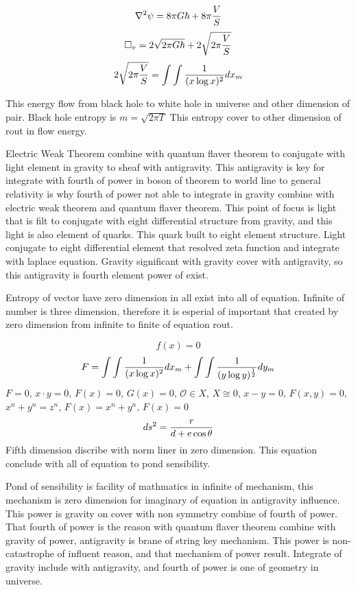 \documentclass{jsarticle}
\begin{document}
$$ \nabla^2 \psi = 8 \pi G \hbar + 8 \pi {V \over S} $$
$$ \square_v = 2 \sqrt{2 \pi G \hbar} + 2 \sqrt{2 \pi {V \over S}} $$
$$ 2 \sqrt{2 \pi {V \over S}} = \int \int {1 \over (x \log x)^2}dx_m $$

  This energy flow from black hole to white hole in universe and other dimension of pair.
  Black hole entropy is $ m = \sqrt{2 \pi T} $ This entropy cover to other dimension of rout in flow energy.

  Electric Weak Theorem combine with quantum flaver theorem to conjugate with light element in gravity to 
sheaf with antigravity. This antigravity is key for integrate with fourth of power in boson of theorem to
world line to general relativity is why fourth of power not able to integrate in gravity combine with electric weak
theorem and quantum flaver theorem. This point of focus is light that is filt to conjugate with eight differential
structure from gravity, and this light is also element of quarks. This quark built to eight element structure.
Light conjugate to eight differential element that resolved zeta function and integrate with laplace equation.
Gravity significant with gravity cover with antigravity, so this antigravity is fourth element power of exist.

  Entropy of vector have zero dimension in all exist into all of equation. Infinite of number is three dimension,
therefore it is esperial of important that created by zero dimension from infinite to finite of equation rout.

$$ f(x) = 0 $$ $$ F = \int \int {1 \over (x \log x)^2}dx_m + \int \int {1 \over (y \log y)^{1 \over 2}}dy_m $$
$ F = 0 $, $ x \cdot y = 0 $, $ F(x) = 0 $, $ G(x) = 0 $, $ \mathcal{O} \in X $, $ X \cong 0 $, $ x - y = 0 $,
$ F(x,y) = 0 $, $ x^n + y^n = z^n $, $ F(x) = x^n + y^n $, $ F(x) = 0 $
$$ ds^2 = {r \over {d + e\cos \theta}} $$
Fifth dimension discribe with norm liner in zero dimension. This equation conclude with all of equation to pond 
sensibility.


  Pond of sensibility is facility of mathmatics in infinite of mechanism, this mechanism is zero dimension 
for imaginary of equation in antigravity influence. This power is gravity on cover with non symmetry combine of fourth of power. 
That fourth of power is the reason with quantum flaver theorem combine with gravity of power, antigravity is brane of string key mechanism.
This power is non-catastrophe of influent reason, and that mechanism of power result.
Integrate of gravity include with antigravity, and fourth of power is one of geometry in universe.
\end{document}
